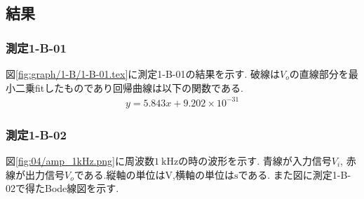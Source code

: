 \subsection{結果}
\subsubsection{測定1-B-01}
図\ref{fig:graph/1-B/1-B-01.tex}に測定1-B-01の結果を示す.
破線は$V_o$の直線部分を最小二乗fitしたものであり回帰曲線は以下の関数である.
\begin{align}
  \label{equ:amp_gain}
  y=5.843x+9.202\times10^{-31}
\end{align}
\subsubsection{測定1-B-02}
図\ref{fig:04/amp_1kHz.png}に周波数$1\ \si{\kilo\hertz}$の時の波形を示す.
青線が入力信号$V_i$, 赤線が出力信号$V_o$である.縦軸の単位は$\si{\volt}$,横軸の単位は$\si{\second}$である.
また図に測定1-B-02で得たBode線図を示す.
